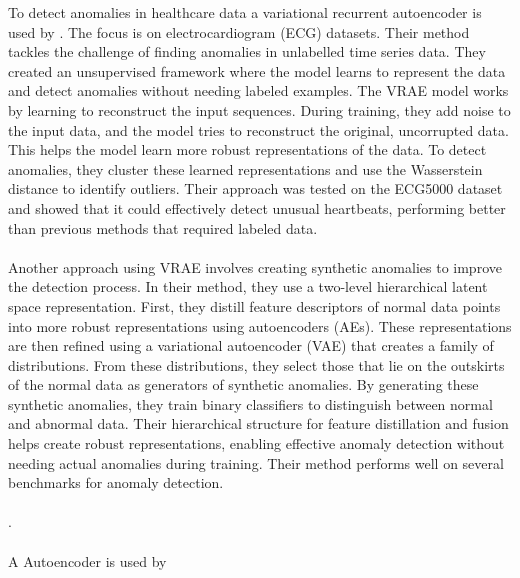 To detect anomalies in healthcare data a variational recurrent autoencoder is used by . %
The focus is on electrocardiogram (ECG) datasets. Their method tackles the challenge of finding anomalies in unlabelled time series data. They created an unsupervised framework where the model learns to represent the data and detect anomalies without needing labeled examples.
The VRAE model works by learning to reconstruct the input sequences. During training, they add noise to the input data, and the model tries to reconstruct the original, uncorrupted data. This helps the model learn more robust representations of the data. To detect anomalies, they cluster these learned representations and use the Wasserstein distance to identify outliers. Their approach was tested on the ECG5000 dataset and showed that it could effectively detect unusual heartbeats, performing better than previous methods that required labeled data. \\\\
Another approach using VRAE involves creating synthetic anomalies to improve the detection process. In their method, they use a two-level hierarchical latent space representation. First, they distill feature descriptors of normal data points into more robust representations using autoencoders (AEs). These representations are then refined using a variational autoencoder (VAE) that creates a family of distributions. From these distributions, they select those that lie on the outskirts of the normal data as generators of synthetic anomalies.
By generating these synthetic anomalies, they train binary classifiers to distinguish between normal and abnormal data. Their hierarchical structure for feature distillation and fusion helps create robust representations, enabling effective anomaly detection without needing actual anomalies during training. Their method performs well on several benchmarks for anomaly detection.\\\\
 \cite{ramirez_rivera_anomaly_2022}. \\\\
A Autoencoder is used by \cite{pranavan_contrastive_2022} \\\\%
